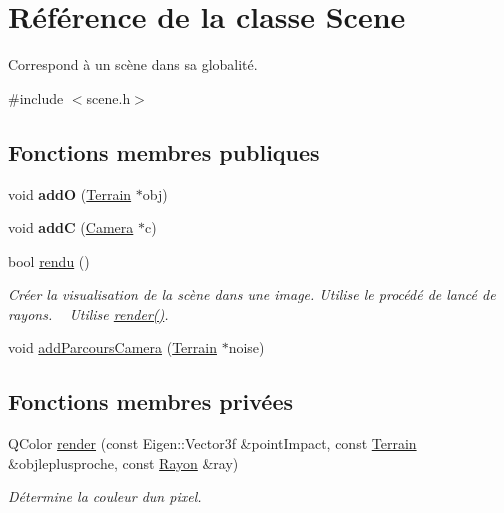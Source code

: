 \hypertarget{class_scene}{}\section{Référence de la classe Scene}
\label{class_scene}


Correspond à un scène dans sa globalité.  




{\ttfamily \#include $<$scene.\+h$>$}

\subsection*{Fonctions membres publiques}
\begin{DoxyCompactItemize}
\item 
\hypertarget{class_scene_a24aafd995cbb2ab79cc2486651c58583}{}void {\bfseries add\+O} (\hyperlink{class_terrain}{Terrain} $\ast$obj)\label{class_scene_a24aafd995cbb2ab79cc2486651c58583}

\item 
\hypertarget{class_scene_ac4b0bd6c6ce0e166a6e24e45b8b016cc}{}void {\bfseries add\+C} (\hyperlink{class_camera}{Camera} $\ast$c)\label{class_scene_ac4b0bd6c6ce0e166a6e24e45b8b016cc}

\item 
bool \hyperlink{class_scene_a5ca5f4203a0dfa959379b978214659ce}{rendu} ()
\begin{DoxyCompactList}\small\item\em Créer la visualisation de la scène dans une image. Utilise le procédé de lancé de rayons. ~\newline
Utilise \hyperlink{class_scene_a1759ca5e74f8bde251720107609d5a69}{render()}. \end{DoxyCompactList}\item 
void \hyperlink{class_scene_af3d56161ec47c25d1bc4eef4c24f8a13}{add\+Parcours\+Camera} (\hyperlink{class_terrain}{Terrain} $\ast$noise)
\end{DoxyCompactItemize}
\subsection*{Fonctions membres privées}
\begin{DoxyCompactItemize}
\item 
Q\+Color \hyperlink{class_scene_a1759ca5e74f8bde251720107609d5a69}{render} (const Eigen\+::\+Vector3f \&point\+Impact, const \hyperlink{class_terrain}{Terrain} \&objleplusproche, const \hyperlink{class_rayon}{Rayon} \&ray)
\begin{DoxyCompactList}\small\item\em Détermine la couleur d\textquotesingle{}un pixel. \end{DoxyCompactList}\end{DoxyCompactItemize}
